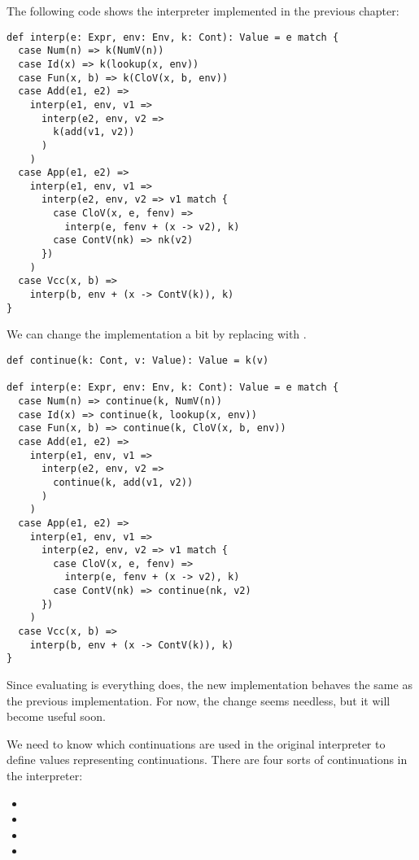 The following code shows the \lang interpreter implemented in the previous
chapter:

\begin{verbatim}
def interp(e: Expr, env: Env, k: Cont): Value = e match {
  case Num(n) => k(NumV(n))
  case Id(x) => k(lookup(x, env))
  case Fun(x, b) => k(CloV(x, b, env))
  case Add(e1, e2) =>
    interp(e1, env, v1 =>
      interp(e2, env, v2 =>
        k(add(v1, v2))
      )
    )
  case App(e1, e2) =>
    interp(e1, env, v1 =>
      interp(e2, env, v2 => v1 match {
        case CloV(x, e, fenv) =>
          interp(e, fenv + (x -> v2), k)
        case ContV(nk) => nk(v2)
      })
    )
  case Vcc(x, b) =>
    interp(b, env + (x -> ContV(k)), k)
}
\end{verbatim}

We can change the implementation a bit by replacing
 with .

\begin{verbatim}
def continue(k: Cont, v: Value): Value = k(v)

def interp(e: Expr, env: Env, k: Cont): Value = e match {
  case Num(n) => continue(k, NumV(n))
  case Id(x) => continue(k, lookup(x, env))
  case Fun(x, b) => continue(k, CloV(x, b, env))
  case Add(e1, e2) =>
    interp(e1, env, v1 =>
      interp(e2, env, v2 =>
        continue(k, add(v1, v2))
      )
    )
  case App(e1, e2) =>
    interp(e1, env, v1 =>
      interp(e2, env, v2 => v1 match {
        case CloV(x, e, fenv) =>
          interp(e, fenv + (x -> v2), k)
        case ContV(nk) => continue(nk, v2)
      })
    )
  case Vcc(x, b) =>
    interp(b, env + (x -> ContV(k)), k)
}
\end{verbatim}

Since evaluating  is everything  does, the new
implementation behaves the same as the previous implementation.
For now, the change seems needless, but it will become useful soon.

We need to know which continuations are used in the original interpreter to
define values representing continuations. There are four sorts of continuations
in the interpreter:

\begin{itemize}
  \item {}
  \item {}
  \item {}
  \item {}
\end{itemize}

